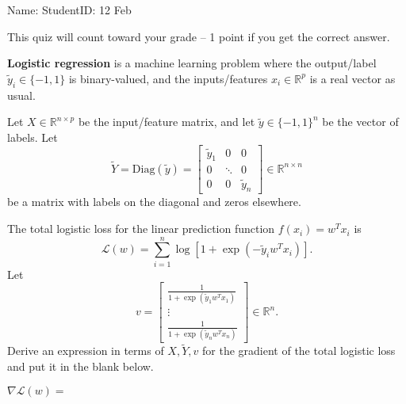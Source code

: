 \documentclass[12pt]{article}
\begin{document}
\thispagestyle{empty}

Name: \underline{\hspace{2in}} StudentID: \underline{\hspace{2in}} 12 Feb

This quiz will count toward your grade -- 1 point if you get the
correct answer.

\textbf{Logistic regression} is a  machine learning problem
where the output/label $\tilde y_i\in\{-1,1 \}$ is binary-valued, and
the inputs/features $x_i\in\mathbb R^p$ is a real vector as usual. 

Let $X\in \mathbb R^{n\times p}$ be the input/feature matrix, and let
$\tilde y\in\{-1,1\}^n$ be the vector of labels. Let
\begin{equation*}
  \tilde Y = \text{Diag}(\tilde y)=\left[
    \begin{array}{ccc}
      \tilde y_1& 0&0\\
      0 & \ddots & 0\\
      0 & 0 & \tilde y_n
    \end{array}
\right]\in\mathbb R^{n\times n}
\end{equation*} 
be a matrix with labels on the diagonal and zeros elsewhere.

The total logistic
loss for the linear prediction function $f(x_i)=w^T x_i$ is
\begin{equation*}
  \mathcal L(w) = \sum_{i=1}^n \log[ 1+ \exp(-\tilde y_i w^Tx_i)].
\end{equation*}
Let 
\begin{equation*}
  v = \left[
  \begin{array}{c}
    \frac{1}{1+\exp(\tilde y_1 w^T x_1)}\\
    \vdots \\ 
    \frac{1}{1+\exp(\tilde y_n w^T x_n)}
  \end{array}
\right]\in\mathbb R^n.
\end{equation*}
Derive an expression in terms of $X,\tilde Y,v$ for the gradient of the
total logistic loss and put it in the blank below.

\vskip 1in

$\nabla \mathcal L(w)= $\underline{\hspace{2in}}
\end{document}
